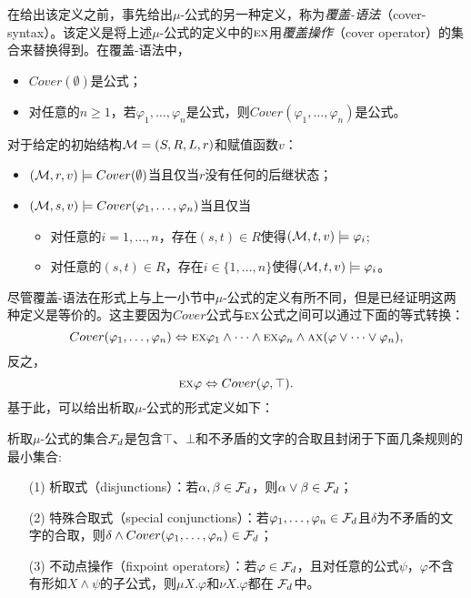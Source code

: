 在给出该定义之前，事先给出$\mu$-公式的另一种定义，称为\emph{覆盖-语法}（cover-syntax）。该定义是将上述$\mu$-公式的定义中的$\textsc{e}\textsc{x}$用\emph{覆盖操作}（cover operator）的集合来替换得到。在覆盖-语法中，
\begin{itemize}
	\item $Cover(\emptyset)$是公式；
	\item 对任意的$n\geq 1$，若$\varphi_1,\dots, \varphi_n$是公式，则$Cover(\varphi_1, \dots, \varphi_n)$是公式。
\end{itemize}
对于给定的初始结构${\cal M}=(S,R,L,r)$和赋值函数$v$：
\begin{itemize}
	\item $({\cal M},r,v) \models Cover(\emptyset)$当且仅当$r$没有任何的后继状态；
	\item $({\cal M}, s,v ) \models Cover(\varphi_1, \dots, \varphi_n)$当且仅当
	\begin{itemize}
		\item 对任意的$i = 1, . . . , n$，存在$(s, t) \in R$使得$({\cal M}, t,v) \models \varphi_i$;
		\item 对任意的$(s, t) \in R$，存在$i\in \{1, . . . , n\}$使得$({\cal M}, t,v) \models \varphi_i$。
	\end{itemize}
\end{itemize}

尽管覆盖-语法在形式上与上一小节中$\mu$-公式的定义有所不同，但是已经证明这两种定义是等价的\cite{d2006modal}。这主要因为$Cover$公式与$\textsc{e}\textsc{x}$公式之间可以通过下面的等式转换：
\[
Cover(\varphi_1, \dots, \varphi_n) \Leftrightarrow \textsc{e}\textsc{x} \varphi_1 \wedge \dots \wedge \textsc{e}\textsc{x} \varphi_n \wedge \textsc{a}\textsc{x}(\varphi \vee \dots \vee \varphi_n),
\]
反之，
\[
\textsc{e}\textsc{x} \varphi \Leftrightarrow Cover(\varphi, \top).
\]
基于此，可以给出析取$\mu$-公式的形式定义如下：
\begin{definition}
	析取$\mu$-公式的集合${\cal F}_d$是包含$\top$、$\bot$和不矛盾的文字的合取且封闭于下面几条规则的最小集合:
	\begin{itemize}
		\item[(1)] 析取式（disjunctions）：若$\alpha, \beta \in {\cal F}_d$，则$\alpha \vee \beta \in {\cal F}_d$；
		\item[(2)] 特殊合取式（special conjunctions）：若$\varphi_1, \dots, \varphi_n\in {\cal F}_d$且$\delta$为不矛盾的文字的合取，则$\delta \wedge Cover(\varphi_1, \dots, \varphi_n) \in {\cal F}_d$；
		\item[(3)] 不动点操作（fixpoint operators）：若$\varphi\in  {\cal F}_d$，且对任意的公式$\psi$，$\varphi$不含有形如$X \wedge \psi$的子公式，则$\mu X. \varphi$和$\nu X. \varphi$都在 ${\cal F}_d$中。
	\end{itemize}	
\end{definition}


